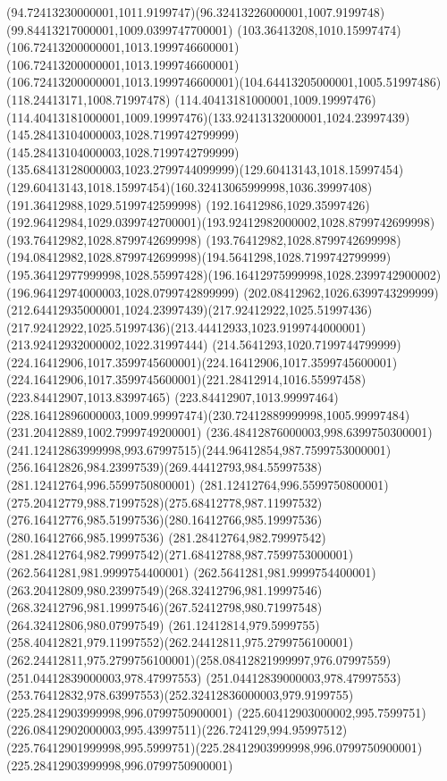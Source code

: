 {{	\curveto(94.72413230000001,1011.9199747)(96.32413226000001,1007.9199748)(99.84413217000001,1009.0399747700001)
	\curveto(103.36413208,1010.15997474)(106.72413200000001,1013.1999746600001)(106.72413200000001,1013.1999746600001)
	\curveto(106.72413200000001,1013.1999746600001)(104.64413205000001,1005.51997486)(118.24413171,1008.71997478)
	\lineto(114.40413181000001,1009.19997476)
	\curveto(114.40413181000001,1009.19997476)(133.92413132000001,1024.23997439)(145.28413104000003,1028.7199742799999)
	\curveto(145.28413104000003,1028.7199742799999)(135.68413128000003,1023.2799744099999)(129.60413143,1018.15997454)
	\curveto(129.60413143,1018.15997454)(160.32413065999998,1036.39997408)(191.36412988,1029.5199742599998)
	\curveto(192.16412986,1029.35997426)(192.96412984,1029.0399742700001)(193.92412982000002,1028.8799742699998)
	\lineto(193.76412982,1028.8799742699998)
	\curveto(193.76412982,1028.8799742699998)(194.08412982,1028.8799742699998)(194.5641298,1028.7199742799999)
	\curveto(195.36412977999998,1028.55997428)(196.16412975999998,1028.2399742900002)(196.96412974000003,1028.0799742899999)
	\curveto(202.08412962,1026.6399743299999)(212.64412935000001,1024.23997439)(217.92412922,1025.51997436)
	\curveto(217.92412922,1025.51997436)(213.44412933,1023.9199744000001)(213.92412932000002,1022.31997444)
	\curveto(214.5641293,1020.7199744799999)(224.16412906,1017.3599745600001)(224.16412906,1017.3599745600001)
	\curveto(224.16412906,1017.3599745600001)(221.28412914,1016.55997458)(223.84412907,1013.83997465)
	\lineto(223.84412907,1013.99997464)
	\curveto(228.16412896000003,1009.99997474)(230.72412889999998,1005.99997484)(231.20412889,1002.7999749200001)
	\curveto(236.48412876000003,998.6399750300001)(241.12412863999998,993.67997515)(244.96412854,987.7599753000001)
	\curveto(256.16412826,984.23997539)(269.44412793,984.55997538)(281.12412764,996.5599750800001)
	\curveto(281.12412764,996.5599750800001)(275.20412779,988.71997528)(275.68412778,987.11997532)
	\curveto(276.16412776,985.51997536)(280.16412766,985.19997536)(280.16412766,985.19997536)
	\lineto(281.28412764,982.79997542)
	\curveto(281.28412764,982.79997542)(271.68412788,987.7599753000001)(262.5641281,981.9999754400001)
	\curveto(262.5641281,981.9999754400001)(263.20412809,980.23997549)(268.32412796,981.19997546)
	\curveto(268.32412796,981.19997546)(267.52412798,980.71997548)(264.32412806,980.07997549)
	\curveto(261.12412814,979.5999755)(258.40412821,979.11997552)(262.24412811,975.2799756100001)
	\curveto(262.24412811,975.2799756100001)(258.08412821999997,976.07997559)(251.04412839000003,978.47997553)
	\curveto(251.04412839000003,978.47997553)(253.76412832,978.63997553)(252.32412836000003,979.9199755)
	\closepath
	\moveto(225.28412903999998,996.0799750900001)
	\curveto(225.60412903000002,995.7599751)(226.08412902000003,995.43997511)(226.724129,994.95997512)
	\curveto(225.76412901999998,995.5999751)(225.28412903999998,996.0799750900001)(225.28412903999998,996.0799750900001)
	\closepath
}
}
